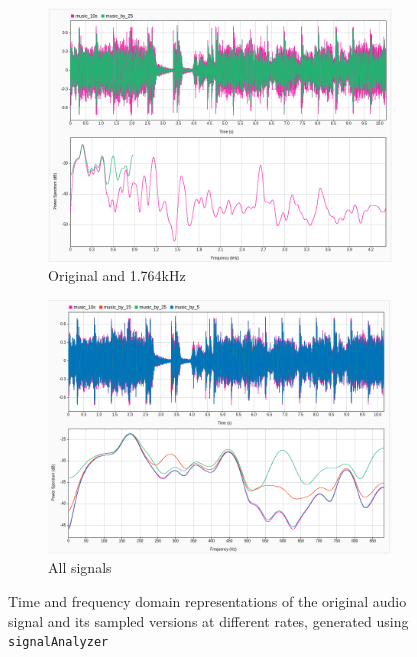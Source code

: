 \documentclass[12pt]{article}
\newcommand{\code}[1]{\colorbox{gray!20}{\texttt{#1}}}
\begin{document}
\begin{figure}[htbp]
\begin{subfigure}[b]{0.48\textwidth}
    \includegraphics[width=\linewidth]{labs/lab1/lab-report-tex/figures/SigAnalyzer/part B/orig_by25.png}
    \caption{Original and 1.764kHz}
    \label{fig:f2}
  \end{subfigure}
  \begin{subfigure}[b]{0.48\textwidth} %
    \includegraphics[width=\linewidth]{labs/lab1/lab-report-tex/figures/SigAnalyzer/part B/all.png}
    \caption{All signals}
    \label{fig:f2}
  \end{subfigure}
  \caption{Time and frequency domain representations of the original audio signal and its sampled versions at different rates, generated using \code{signalAnalyzer}}
\end{figure}
\FloatBarrier
\end{document}
